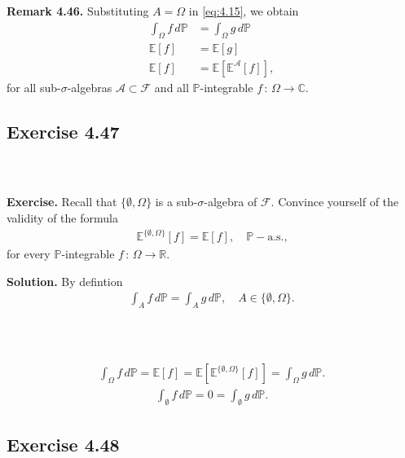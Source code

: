 \documentclass{beamer}
\numberwithin{equation}{section}
\newenvironment{frame2}{\begin{frame}\frametitle{{\normalsize \secname} \\ {\large \subsecname}}}{\end{frame}}
\begin{document}
\begin{frame2}
    \textbf{Remark 4.46.}
    Substituting $A = \Omega$ in \eqref{eq:4.15}, we obtain
    \begin{align}
        \int_\Omega f\, d\mathbb{P} &= \int_\Omega g\, d\mathbb{P} \\
        \mathbb{E}[f] &= \mathbb{E}\left[g\right] \\
        \mathbb{E}[f] &= \mathbb{E}\left[\mathbb{E}^\mathcal{A}\left[f\right]\right],
    \end{align}
    for all sub-$\sigma$-algebras $\mathcal{A} \subset \mathcal{F}$ and all $\mathbb{P}$-integrable $f \, : \, \Omega \rightarrow \mathbb{C}$.
\end{frame2}

\subsection{Exercise 4.47}

\begin{frame2}
    \textbf{Exercise.}
    Recall that $\{\emptyset,\Omega\}$ is a sub-$\sigma$-algebra of $\mathcal{F}$.
    Convince yourself of the validity of the formula
    \begin{align}
        \mathbb{E}^{\{\emptyset,\Omega\}}[f] = \mathbb{E}[f],\quad \mathbb{P}-\text{a.s.,}
    \end{align}
    for every $\mathbb{P}$-integrable $f \, : \, \Omega \rightarrow \mathbb{R}$.

    \vspace{10pt}
    \textbf{Solution.}
    By defintion
    \begin{align}
        \int_Af\, d\mathbb{P} = \int_Ag\, d\mathbb{P}, \quad A \in \{\emptyset,\Omega\}.
    \end{align}
\end{frame2}

\begin{frame2}
    \begin{align}
        \int_\Omega f\, d\mathbb{P} = \mathbb{E}\left[f\right] = \mathbb{E}\left[\mathbb{E}^{\{\emptyset,\Omega\}}\left[f\right]\right] = \int_\Omega g\, d\mathbb{P}.
    \end{align}
    \begin{align}
        \int_\emptyset f\, d\mathbb{P} = 0 = \int_\emptyset g\, d\mathbb{P}.
    \end{align}
\end{frame2}

\subsection{Exercise 4.48}
\end{document}
